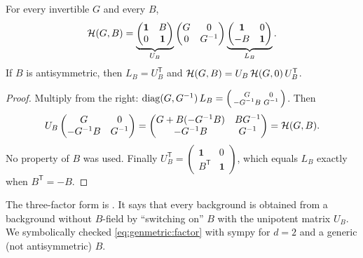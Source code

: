 \begin{proposition}[Factorization]\label{prop:genmetric:factor}
For every invertible $G$ and every $B$,
\begin{equation}\label{eq:genmetric:factor}
 \mathcal{H}(G,B)=
 \underbrace{\begin{pmatrix}\mathbf 1&B\\0&\mathbf 1\end{pmatrix}}_{U_B}
 \begin{pmatrix}G&0\\0&G^{-1}\end{pmatrix}
 \underbrace{\begin{pmatrix}\mathbf 1&0\\-B&\mathbf 1\end{pmatrix}}_{L_B}.
\end{equation}
If $B$ is antisymmetric, then $L_B=U_B^{\mathsf T}$ and
$\mathcal{H}(G,B)=U_B\,\mathcal{H}(G,0)\,U_B^{\mathsf T}$.
\end{proposition}
\begin{proof}
Multiply from the right:
$\operatorname{diag}(G,G^{-1})\,L_B=\left(\begin{smallmatrix}G&0\\-G^{-1}B&G^{-1}\end{smallmatrix}\right)$.
Then
\[
 U_B\begin{pmatrix}G&0\\-G^{-1}B&G^{-1}\end{pmatrix}
 =\begin{pmatrix}G+B(-G^{-1}B)&BG^{-1}\\-G^{-1}B&G^{-1}\end{pmatrix}=\mathcal{H}(G,B).
\]
No property of $B$ was used. Finally
$U_B^{\mathsf T}=\left(\begin{smallmatrix}\mathbf 1&0\\B^{\mathsf T}&\mathbf 1
\end{smallmatrix}\right)$, which equals $L_B$ exactly when $B^{\mathsf T}=-B$.
\end{proof}
\noindent The three-factor form is . It says that
every background is obtained from a background without $B$-field by ``switching on'' $B$
with the unipotent matrix $U_B$. We symbolically checked \eqref{eq:genmetric:factor} with
sympy for $d=2$ and a generic (not antisymmetric) $B$.

